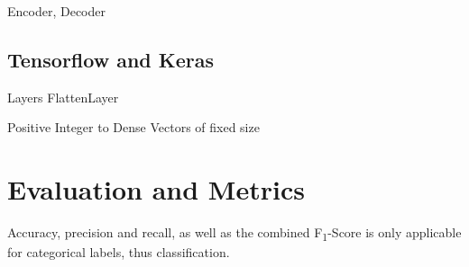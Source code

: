 Encoder, Decoder

\subsection{Tensorflow and Keras}
Layers
FlattenLayer

Positive Integer to Dense Vectors of fixed size

\section{Evaluation and Metrics}

%
%
%
%

Accuracy, precision and recall, as well as the combined F\textsubscript{1}-Score is only applicable for categorical labels, thus classification.

